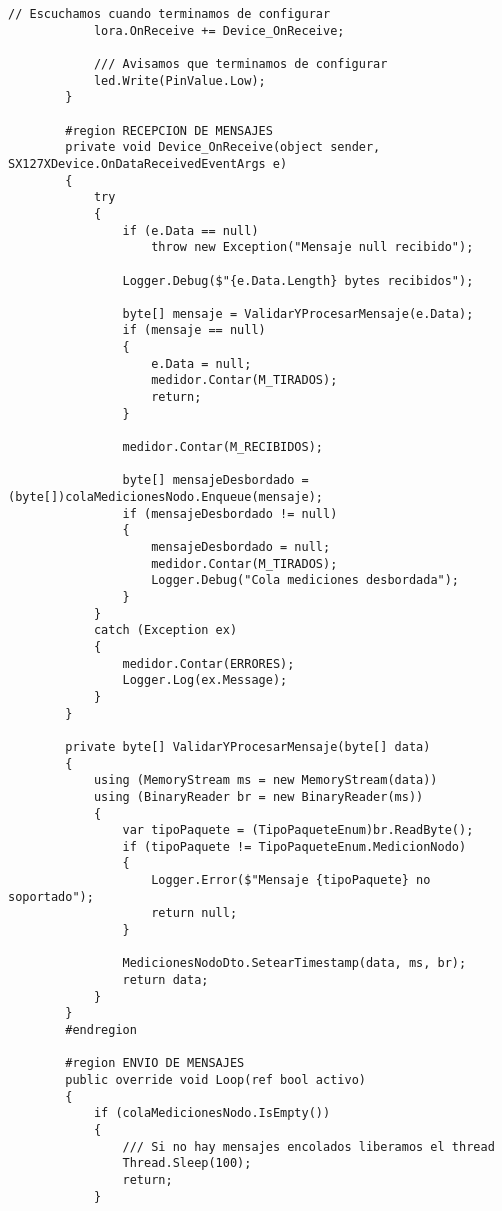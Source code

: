 \begin{lstlisting}[caption={Ejemplo de código en C\#}]
            // Escuchamos cuando terminamos de configurar
            lora.OnReceive += Device_OnReceive;

            /// Avisamos que terminamos de configurar
            led.Write(PinValue.Low);
        }

        #region RECEPCION DE MENSAJES
        private void Device_OnReceive(object sender, SX127XDevice.OnDataReceivedEventArgs e)
        {
            try
            {
                if (e.Data == null)
                    throw new Exception("Mensaje null recibido");

                Logger.Debug($"{e.Data.Length} bytes recibidos");

                byte[] mensaje = ValidarYProcesarMensaje(e.Data);
                if (mensaje == null)
                {
                    e.Data = null;
                    medidor.Contar(M_TIRADOS);
                    return;
                }

                medidor.Contar(M_RECIBIDOS);

                byte[] mensajeDesbordado = (byte[])colaMedicionesNodo.Enqueue(mensaje);
                if (mensajeDesbordado != null)
                {
                    mensajeDesbordado = null;
                    medidor.Contar(M_TIRADOS);
                    Logger.Debug("Cola mediciones desbordada");
                }
            }
            catch (Exception ex)
            {
                medidor.Contar(ERRORES);
                Logger.Log(ex.Message);
            }
        }

        private byte[] ValidarYProcesarMensaje(byte[] data)
        {
            using (MemoryStream ms = new MemoryStream(data))
            using (BinaryReader br = new BinaryReader(ms))
            {
                var tipoPaquete = (TipoPaqueteEnum)br.ReadByte();
                if (tipoPaquete != TipoPaqueteEnum.MedicionNodo)
                {
                    Logger.Error($"Mensaje {tipoPaquete} no soportado");
                    return null;
                }

                MedicionesNodoDto.SetearTimestamp(data, ms, br);
                return data;
            }
        }
        #endregion

        #region ENVIO DE MENSAJES
        public override void Loop(ref bool activo)
        {
            if (colaMedicionesNodo.IsEmpty())
            {
                /// Si no hay mensajes encolados liberamos el thread
                Thread.Sleep(100);
                return;
            }


\end{lstlisting}
